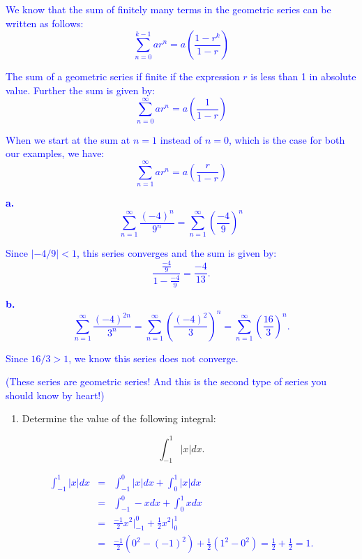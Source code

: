 \documentclass[
]{article}
\providecommand{\tightlist}{%
  \setlength{\itemsep}{0pt}\setlength{\parskip}{0pt}}
\begin{document}
\textcolor{blue}{We know that the sum of finitely many terms in the geometric series can be written as follows:
$$\sum_{n = 0}^{k-1} a r^n = a \left( \frac{1 - r^k}{1 - r}\right)$$}

\textcolor{blue}{The sum of a geometric series if finite if the expression $r$ is less than 1 in absolute value. Further the sum is given by:
$$\sum_{n = 0}^{\infty} a r^n = a \left( \frac{1}{1 - r}\right)$$}

\textcolor{blue}{When we start at the sum at $n = 1$ instead of $n = 0$, which is the case for both our examples, we have:
$$\sum_{n = 1}^{\infty} a r^n = a \left( \frac{r}{1 - r}\right)$$}

\textcolor{blue}{\textbf{a.}
$$\sum_{n = 1}^{\infty} \frac{(-4)^n}{9^n} = \sum_{n = 1}^{\infty} \left( \frac{-4}{9} \right)^n$$}

\textcolor{blue}{Since $| -4/9 | < 1$, this series converges and the sum is given by:
$$\frac{ \frac{-4}{9} }{1 - \frac{-4}{9}} = \frac{-4}{13}.$$}

\textcolor{blue}{\textbf{b.}
$$\sum_{n = 1}^{\infty} \frac{(-4)^{2n}}{3^n} = \sum_{n = 1}^{\infty} \left( \frac{(-4)^2}{3}\right)^n   = \sum_{n = 1}^{\infty} \left( \frac{16}{3} \right)^n.$$}

\textcolor{blue}{Since $16/3 > 1$, we know this series does not converge.}

\textcolor{blue}{(These series are geometric series! And this is the second type of series you should know by heart!)}

\hfill\break

\begin{enumerate}
\def\labelenumi{\arabic{enumi}.}
\setcounter{enumi}{5}
\tightlist
\item
  Determine the value of the following integral:
\end{enumerate}

\[\int_{-1}^{1} | x | dx.\]

\textcolor{blue}{
\begin{eqnarray}
\int_{-1}^1 |x| dx & = & \int_{-1}^0 |x| dx + \int_{0}^{1} |x| dx \nonumber \\
                          & = & \int_{-1}^0 -x dx  + \int_{0}^{1} x dx \nonumber \\
                          & = & \frac{-1}{2} x^2 \Biggr|_{-1}^{0} + \frac{1}{2}  x^2 \Biggr|_{0}^{1} \nonumber \\
                          & = & \frac{-1}{2} \left( 0^2 - (-1)^2 \right) + \frac{1}{2} \left( 1^2 - 0^2 \right) = \frac{1}{2} + \frac{1}{2} = 1. \nonumber
\end{eqnarray}
}
\end{document}
